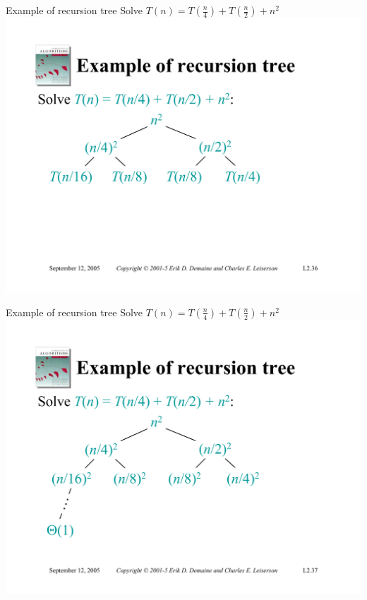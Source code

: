\documentclass{beamer}
\begin{document}
\begin{frame}{Example of recursion tree}
    Solve $T(n) = T\left(\frac{n}{4}\right) + T\left(\frac{n}{2}\right) + n^2$
    \includegraphics[width=\textwidth, trim={1.10cm 1.20cm 0.30cm 5.75cm}, clip]{pages/lec2_36}
\end{frame}
\begin{frame}{Example of recursion tree}
    Solve $T(n) = T\left(\frac{n}{4}\right) + T\left(\frac{n}{2}\right) + n^2$
    \includegraphics[width=\textwidth, trim={1.10cm 1.20cm 0.30cm 5.75cm}, clip]{pages/lec2_37}
\end{frame}
\end{document}
